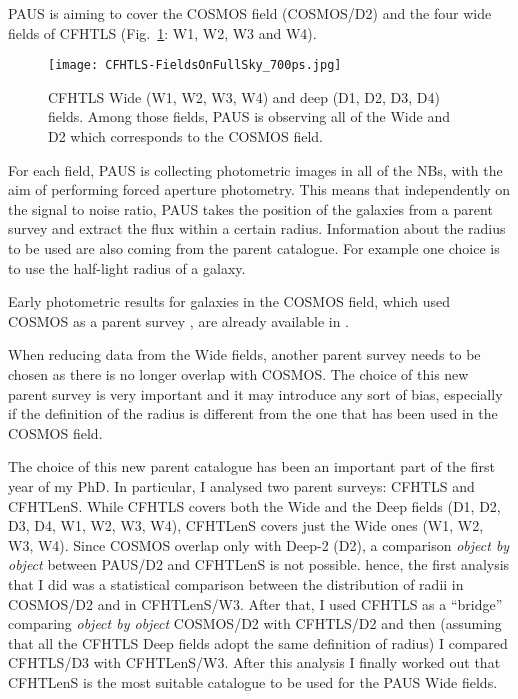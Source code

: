 \documentclass[11pt]{article}
\begin{document}
PAUS is aiming to cover the COSMOS field (COSMOS/D2) and the four wide fields of CFHTLS (Fig.~\ref{fig:CFHTLS_fields}: W1, W2, W3 and W4).
%
\begin{figure}
\centering
\texttt{[image: CFHTLS-FieldsOnFullSky\_700ps.jpg]}
\caption{CFHTLS Wide (W1, W2, W3, W4) and deep (D1, D2, D3, D4) fields. Among those fields, PAUS is observing all of the Wide and D2 which corresponds to the COSMOS field. }
\label{fig:CFHTLS_fields}
\end{figure}
%
For each field, PAUS is collecting photometric images in all of the NBs, with the aim of performing forced aperture photometry. This means that independently on the signal to noise ratio, PAUS takes the position of the galaxies from a parent survey and extract the flux within a certain radius. Information about the radius to be used are also coming from the parent catalogue. For example one choice is to use the half-light radius of a galaxy.

Early photometric results for galaxies in the COSMOS field, which used COSMOS as a parent survey \citep{scarlata07}, are already available in \cite{eriksen18}. 

When reducing data from the Wide fields, another parent survey needs to be chosen as there is no longer overlap with COSMOS. The choice of this new parent survey is very important and it may introduce any sort of bias, especially if the definition of the radius is different from the one that has been used in the COSMOS field. 

The choice of this new parent catalogue has been an important part of the first year of my PhD. In particular, I analysed two parent surveys: CFHTLS and CFHTLenS. While CFHTLS covers both the Wide and the Deep fields (D1, D2, D3, D4, W1, W2, W3, W4), CFHTLenS covers just the Wide ones (W1, W2, W3, W4). Since COSMOS overlap only with Deep-2 (D2), a comparison \textit{object by object} between PAUS/D2 and CFHTLenS is not possible. hence, the first analysis that I did was a statistical comparison between the distribution of radii in COSMOS/D2 and in CFHTLenS/W3. After that, I used CFHTLS as a ``bridge'' comparing \textit{object by object} COSMOS/D2 with CFHTLS/D2 and then (assuming that all the CFHTLS Deep fields adopt the same definition of radius) I compared CFHTLS/D3 with CFHTLenS/W3. After this analysis I finally worked out that CFHTLenS is the most suitable catalogue to be used for the PAUS Wide fields. \\
\end{document}
